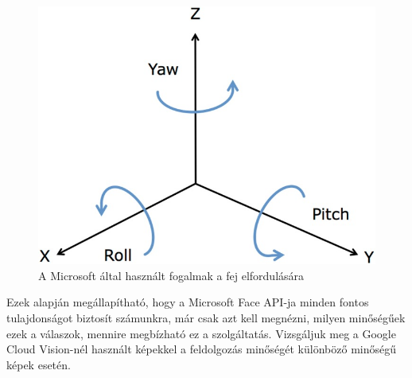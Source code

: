 \begin{figure}[h]
\centering
  \includegraphics[scale=2]{img/roll_yaw_pitch}
    \caption{A Microsoft által használt fogalmak a fej elfordulására \cite{roll_yaw_pitch}}
\end{figure}

Ezek alapján megállapítható, hogy a Microsoft Face API-ja minden fontos tulajdonságot biztosít számunkra, már csak azt kell megnézni, milyen minőségűek ezek a válaszok, mennire megbízható ez a szolgáltatás. Vizsgáljuk meg a Google Cloud Vision-nél használt képekkel a feldolgozás minőségét különböző minőségű képek esetén.


